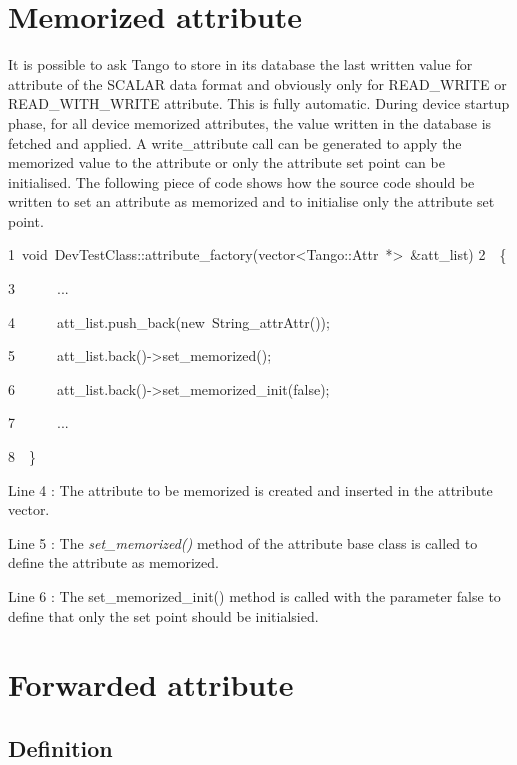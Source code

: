 \section{Memorized attribute}

It is possible to ask Tango to store in its database the last written
value for attribute of the SCALAR data format and obviously only for
READ\_WRITE or READ\_WITH\_WRITE attribute. This is fully automatic.
During device startup phase, for all device memorized
attributes, the value written in the database is fetched and applied.
A write\_attribute call can be generated to apply the memorized value
to the attribute or only the attribute set point can be initialised.
The following piece of code shows how the source code should be written
to set an attribute as memorized and to initialise only the attribute
set point.



\begin{lyxcode}
1~void~DevTestClass::attribute\_factory(vector<Tango::Attr~{*}>~\&att\_list)
2~~\{

3~~~~~~...

4~~~~~~att\_list.push\_back(new~String\_attrAttr());

5~~~~~~att\_list.back()->set\_memorized();

6~~~~~~att\_list.back()->set\_memorized\_init(false);

7~~~~~~...

8~~\}
\end{lyxcode}


Line 4 : The attribute to be memorized is created and inserted in
the attribute vector.

Line 5 : The \emph{set\_memorized()} method of the attribute base
class is called to define the attribute as memorized.

Line 6 : The set\_memorized\_init() method is called with the parameter
false to define that only the set point should be initialsied.

\section{Forwarded attribute}

\subsection{Definition}

